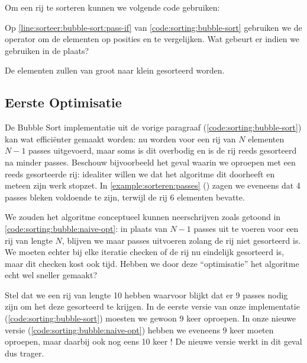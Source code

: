 \begin{example} \label{example:sorteer-bubblesort}
Om een rij te sorteren kunnen we volgende code gebruiken:
\end{example}

\begin{exercise}
Op \cref{line:sorteer:bubble-sort:pass-if} van \cref{code:sorting:bubble-sort}
gebruiken we de operator \inlinecode{>} om de elementen op posities 
en  te vergelijken. Wat gebeurt er indien we \inlinecode{<} gebruiken in de plaats?
\begin{solution}
De elementen zullen van groot naar klein gesorteerd worden.
\end{solution}
\end{exercise}

\subsection{Eerste Optimisatie} \label{sec:sorteren:bubble-sort:opt1}
De Bubble Sort implementatie uit de vorige paragraaf (\cref{code:sorting:bubble-sort})
kan wat effici\"enter gemaakt worden: nu worden voor een rij van $N$ elementen
$N-1$ passes uitgevoerd, maar soms is dit overbodig en is de rij reeds gesorteerd
na minder passes. Beschouw bijvoorbeeld het geval waarin we 
oproepen met een reeds gesorteerde rij: idealiter willen we dat het algoritme
dit doorheeft en meteen zijn werk stopzet. In \cref{example:sorteren:passes} ()
zagen we eveneens dat 4 passes bleken voldoende te zijn, terwijl de rij 6 elementen bevatte.


We zouden het algoritme conceptueel kunnen neerschrijven zoals getoond in \cref{code:sorting:bubble:naive-opt}:
in plaats van $N-1$ passes uit te voeren voor een rij van lengte $N$, blijven
we maar passes uitvoeren zolang de rij niet gesorteerd is.
We moeten echter bij elke iteratie checken of de rij nu eindelijk gesorteerd is,
maar dit checken kost ook tijd. Hebben we door deze ``optimisatie'' het algoritme
echt wel sneller gemaakt?

Stel dat we een rij van lengte 10 hebben waarvoor blijkt dat er 9 passes nodig
zijn om het deze gesorteerd te krijgen. In de eerste versie van onze implementatie
(\cref{code:sorting:bubble-sort}) moesten we gewoon 9 keer  oproepen.
In onze nieuwe versie (\cref{code:sorting:bubble:naive-opt}) hebben we eveneens
9 keer  moeten oproepen, maar daarbij ook nog eens
10 keer ! De nieuwe versie werkt in dit geval dus trager.

